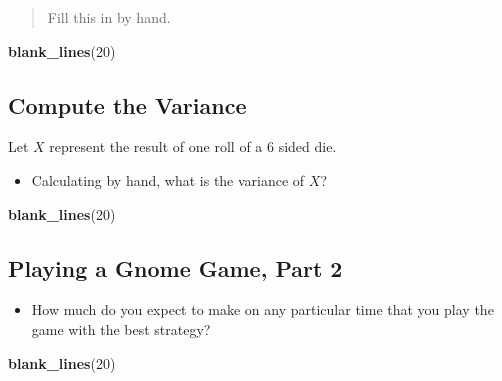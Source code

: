 \documentclass[
]{book}
\newenvironment{Shaded}{\begin{snugshade}}{\end{snugshade}}
\newcommand{\DecValTok}[1]{\textcolor[rgb]{0.00,0.00,0.81}{#1}}
\newcommand{\FunctionTok}[1]{\textcolor[rgb]{0.13,0.29,0.53}{\textbf{#1}}}
\newcommand{\NormalTok}[1]{#1}
\providecommand{\tightlist}{%
  \setlength{\itemsep}{0pt}\setlength{\parskip}{0pt}}
\theoremstyle{definition}
\theoremstyle{definition}
\theoremstyle{definition}
\theoremstyle{definition}
\theoremstyle{remark}
\begin{document}
\begin{quote}
Fill this in by hand.
\end{quote}

\begin{Shaded}
\begin{Highlighting}[]
\FunctionTok{blank\_lines}\NormalTok{(}\DecValTok{20}\NormalTok{)}
\end{Highlighting}
\end{Shaded}

\vspace{20cm}

\subsection{Compute the Variance}\label{compute-the-variance}

Let \(X\) represent the result of one roll of a 6 sided die.

\begin{itemize}
\tightlist
\item
  Calculating by hand, what is the variance of \(X\)?
\end{itemize}

\begin{Shaded}
\begin{Highlighting}[]
\FunctionTok{blank\_lines}\NormalTok{(}\DecValTok{20}\NormalTok{)}
\end{Highlighting}
\end{Shaded}

\vspace{20cm}

\subsection{Playing a Gnome Game, Part 2}\label{playing-a-gnome-game-part-2}

\begin{itemize}
\tightlist
\item
  How much do you expect to make on any particular time that you play the game with the best strategy?
\end{itemize}

\begin{Shaded}
\begin{Highlighting}[]
\FunctionTok{blank\_lines}\NormalTok{(}\DecValTok{20}\NormalTok{)}
\end{Highlighting}
\end{Shaded}

\vspace{20cm}
\end{document}
